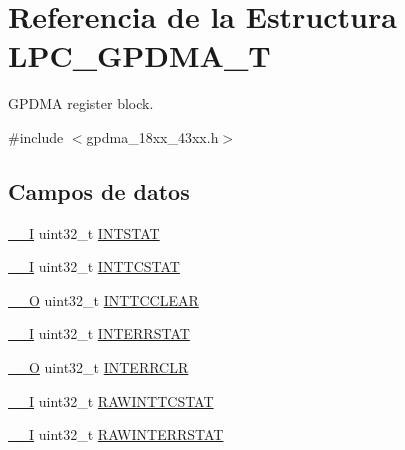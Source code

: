 \hypertarget{struct_l_p_c___g_p_d_m_a___t}{}\section{Referencia de la Estructura L\+P\+C\+\_\+\+G\+P\+D\+M\+A\+\_\+T}
\label{struct_l_p_c___g_p_d_m_a___t}


G\+P\+D\+MA register block.  




{\ttfamily \#include $<$gpdma\+\_\+18xx\+\_\+43xx.\+h$>$}

\subsection*{Campos de datos}
\begin{DoxyCompactItemize}
\item 
\hyperlink{core__sc300_8h_af63697ed9952cc71e1225efe205f6cd3}{\+\_\+\+\_\+I} uint32\+\_\+t \hyperlink{struct_l_p_c___g_p_d_m_a___t_a0bbac120700e7e8084acf696d17068ab}{I\+N\+T\+S\+T\+AT}
\item 
\hyperlink{core__sc300_8h_af63697ed9952cc71e1225efe205f6cd3}{\+\_\+\+\_\+I} uint32\+\_\+t \hyperlink{struct_l_p_c___g_p_d_m_a___t_a463cfd3eb2db7443d3af7538ed7d0043}{I\+N\+T\+T\+C\+S\+T\+AT}
\item 
\hyperlink{core__sc300_8h_a7e25d9380f9ef903923964322e71f2f6}{\+\_\+\+\_\+O} uint32\+\_\+t \hyperlink{struct_l_p_c___g_p_d_m_a___t_a3cdb3b46c6338446b38e098d533f3e90}{I\+N\+T\+T\+C\+C\+L\+E\+AR}
\item 
\hyperlink{core__sc300_8h_af63697ed9952cc71e1225efe205f6cd3}{\+\_\+\+\_\+I} uint32\+\_\+t \hyperlink{struct_l_p_c___g_p_d_m_a___t_a4c2fe03b9b6300d7eb967bcfde72dce5}{I\+N\+T\+E\+R\+R\+S\+T\+AT}
\item 
\hyperlink{core__sc300_8h_a7e25d9380f9ef903923964322e71f2f6}{\+\_\+\+\_\+O} uint32\+\_\+t \hyperlink{struct_l_p_c___g_p_d_m_a___t_ade4abb628310cbd8a99c564c40293b9a}{I\+N\+T\+E\+R\+R\+C\+LR}
\item 
\hyperlink{core__sc300_8h_af63697ed9952cc71e1225efe205f6cd3}{\+\_\+\+\_\+I} uint32\+\_\+t \hyperlink{struct_l_p_c___g_p_d_m_a___t_a4daa613529d2cf0ff2eb1f2dc2c913fa}{R\+A\+W\+I\+N\+T\+T\+C\+S\+T\+AT}
\item 
\hyperlink{core__sc300_8h_af63697ed9952cc71e1225efe205f6cd3}{\+\_\+\+\_\+I} uint32\+\_\+t \hyperlink{struct_l_p_c___g_p_d_m_a___t_a22b61f0d5cc576a11cc44b34cfee7e60}{R\+A\+W\+I\+N\+T\+E\+R\+R\+S\+T\+AT}
\item 

\end{DoxyCompactItemize}
